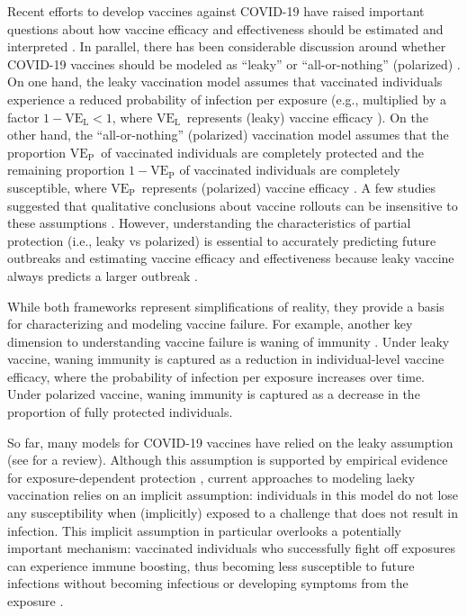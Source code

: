 \documentclass[12pt]{article}
\newcommand{\VE}{\ensuremath{\mathrm{VE}}}
\newcommand{\VEP}{\ensuremath{\VE_{\mathrm{P}}}}
\newcommand{\VEL}{\ensuremath{\VE_{\mathrm{L}}}}
\begin{document}
Recent efforts to develop vaccines against COVID-19 have raised important questions about how vaccine efficacy and effectiveness should be estimated \citep{kennedy2021estimating,lipsitch2021interpreting,kahn2022identifying,follmann2023vaccine,kahn2024examining} and interpreted \citep{lipsitch2020understanding,imai2021interpreting}.
In parallel, there has been considerable discussion around whether COVID-19 vaccines should be modeled as ``leaky'' or ``all-or-nothing'' (polarized) \citep{han2021time,kahn2022identifying,liu2022optimizing,miura2023inferring,otto2024endemic}.
On one hand, the leaky vaccination model assumes that vaccinated individuals experience a reduced probability of infection per exposure (e.g., multiplied by a factor $1-\VEL < 1$, where \VEL\ represents (leaky) vaccine efficacy \citep{smith1984assessment}).
On the other hand, the ``all-or-nothing'' (polarized) vaccination model assumes that the proportion \VEP\ of vaccinated individuals are completely protected and the remaining proportion $1-\VEP$ of vaccinated individuals are completely susceptible, where \VEP\ represents (polarized) vaccine efficacy \citep{gog2002dynamics,gomes2014missing}.
A few studies suggested that qualitative conclusions about vaccine rollouts can be insensitive to these assumptions \citep{bubar2021model,keeling2023impacts}.
However, understanding the characteristics of partial protection (i.e., leaky vs polarized) is essential to accurately predicting future outbreaks and estimating vaccine efficacy and effectiveness because leaky vaccine always predicts a larger outbreak \citep{smith1984assessment}.

While both frameworks represent simplifications of reality, they provide a basis for characterizing and modeling vaccine failure.
For example, another key dimension to understanding vaccine failure is waning of immunity \citep{heffernan2009implications}.
Under leaky vaccine, waning immunity is captured as a reduction in individual-level vaccine efficacy, where the probability of infection per exposure increases over time.
Under polarized vaccine, waning immunity is captured as a decrease in the proportion of fully protected individuals.

So far, many models for COVID-19 vaccines have relied on the leaky assumption (see \cite{liu2022optimizing} for a review).
Although this assumption is supported by empirical evidence for exposure-dependent protection \citep{lind2023evidence}, current approaches to modeling laeky vaccination relies on an implicit assumption: 
individuals in this model do not lose any susceptibility when (implicitly) exposed to a challenge that does not result in infection. 
This implicit assumption in particular overlooks a potentially important mechanism:
vaccinated individuals who successfully fight off exposures can experience immune boosting, thus becoming less susceptible to future infections without becoming infectious or developing symptoms from the exposure \citep{lavine2011natural,yang2020waning}.
\end{document}

